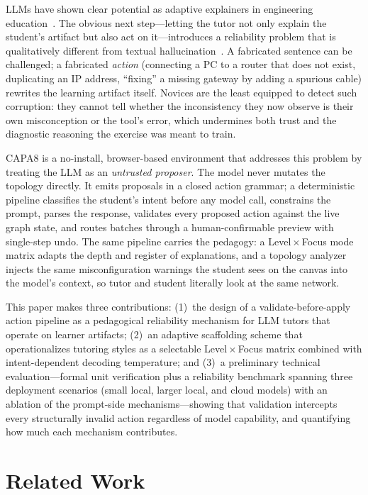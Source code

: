 \documentclass[conference,a4paper]{IEEEtran}
\begin{document}
LLMs have shown clear potential as adaptive explainers in engineering education~\cite{kasneci2023chatgpt,denny2024computing}. The obvious next step---letting the tutor not only explain the student's artifact but also act on it---introduces a reliability problem that is qualitatively different from textual hallucination~\cite{ji2023survey}. A fabricated sentence can be challenged; a fabricated \emph{action} (connecting a PC to a router that does not exist, duplicating an IP address, ``fixing'' a missing gateway by adding a spurious cable) rewrites the learning artifact itself. Novices are the least equipped to detect such corruption: they cannot tell whether the inconsistency they now observe is their own misconception or the tool's error, which undermines both trust and the diagnostic reasoning the exercise was meant to train.

CAPA8 is a no-install, browser-based environment that addresses this problem by treating the LLM as an \emph{untrusted proposer}. The model never mutates the topology directly. It emits proposals in a closed action grammar; a deterministic pipeline classifies the student's intent before any model call, constrains the prompt, parses the response, validates every proposed action against the live graph state, and routes batches through a human-confirmable preview with single-step undo. The same pipeline carries the pedagogy: a Level\,$\times$\,Focus mode matrix adapts the depth and register of explanations, and a topology analyzer injects the same misconfiguration warnings the student sees on the canvas into the model's context, so tutor and student literally look at the same network.

This paper makes three contributions: (1)~the design of a validate-before-apply action pipeline as a pedagogical reliability mechanism for LLM tutors that operate on learner artifacts; (2)~an adaptive scaffolding scheme that operationalizes tutoring styles as a selectable Level\,$\times$\,Focus matrix combined with intent-dependent decoding temperature; and (3)~a preliminary technical evaluation---formal unit verification plus a reliability benchmark spanning three deployment scenarios (small local, larger local, and cloud models) with an ablation of the prompt-side mechanisms---showing that validation intercepts every structurally invalid action regardless of model capability, and quantifying how much each mechanism contributes.

\section{Related Work}
\end{document}

